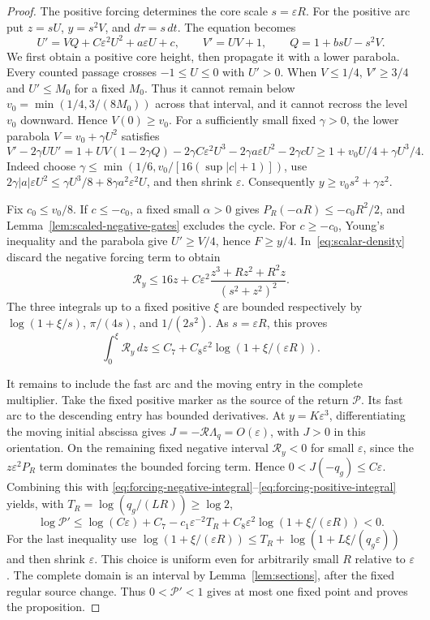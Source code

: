 \begin{proof}
The positive forcing determines the core scale $s=\varepsilon R$.
For the positive arc put $z=sU$, $y=s^2V$,
and $d\tau=s\,dt$. The equation becomes
\[
 U'=VQ+C\varepsilon^2U^2+a\varepsilon U+c,
 \qquad V'=UV+1,
 \qquad Q=1+bsU-s^2V.
\]
We first obtain a positive core height, then propagate it with a lower
parabola. Every counted passage crosses $-1\le U\le0$ with $U'>0$.
When $V\le1/4$, $V'\ge3/4$ and $U'\le M_0$ for a fixed
$M_0$. Thus it cannot remain below
$v_0=\min(1/4,3/(8M_0))$ across that interval, and it cannot
recross the level $v_0$ downward. Hence $V(0)\ge v_0$.
For a sufficiently small fixed $\gamma>0$, the lower parabola
$V=v_0+\gamma U^2$ satisfies
\[
 V'-2\gamma UU'
 =1+UV(1-2\gamma Q)-2\gamma C\varepsilon^2U^3
                         -2\gamma a\varepsilon U^2-2\gamma cU
 \ge1+v_0U/4+\gamma U^3/4.
\]
Indeed choose $\gamma\le\min(1/6,v_0/[16(\sup|c|+1)])$,
use $2\gamma|a|\varepsilon U^2\le\gamma U^3/8+
8\gamma a^2\varepsilon^2U$, and then shrink $\varepsilon$.
Consequently $y\ge v_0s^2+\gamma z^2$.

Fix $c_0\le v_0/8$. If $c\le-c_0$, a fixed small
$\alpha>0$ gives $P_R(-\alpha R)\le-c_0R^2/2$, and
Lemma~\ref{lem:scaled-negative-gates} excludes the cycle.
For $c\ge-c_0$, Young's inequality and the parabola give
$U'\ge V/4$, hence $F\ge y/4$. In~\eqref{eq:scalar-density}
discard the negative forcing term to obtain
\[
 \mathcal R_y\le16z+C\varepsilon^2
                  \frac{z^3+Rz^2+R^2z}{(s^2+z^2)^2}.
\]
The three integrals up to a fixed positive $\xi$ are bounded
respectively by $\log(1+\xi/s)$, $\pi/(4s)$, and $1/(2s^2)$.
As $s=\varepsilon R$, this proves
\begin{equation}\label{eq:forcing-positive-integral}
 \int_0^\xi\mathcal R_y\,dz
             \le C_7+C_8\varepsilon^2\log(1+\xi/(\varepsilon R)).
\end{equation}

It remains to include the fast arc and the moving entry in the complete
multiplier. Take the fixed positive marker as the source of the return
$\mathcal P$. Its fast arc to the descending entry has bounded
derivatives. At $y=K\varepsilon^3$, differentiating the moving
initial abscissa gives $J=-\mathcal R\Lambda_q=O(\varepsilon)$,
with $J>0$ in this orientation. On the remaining fixed negative
interval $\mathcal R_y<0$ for small $\varepsilon$, since the
$z\varepsilon^2P_R$ term dominates the bounded forcing term.
Hence $0<J(-q_g)\le C\varepsilon$. Combining this with
\eqref{eq:forcing-negative-integral}--\eqref{eq:forcing-positive-integral}
yields, with $T_R=\log(q_g/(LR))\ge\log2$,
\[
 \log\mathcal P'\le\log(C\varepsilon)+C_7
       -c_1\varepsilon^{-2}T_R
       +C_8\varepsilon^2\log(1+\xi/(\varepsilon R))<0.
\]
For the last inequality use
$\log(1+\xi/(\varepsilon R))\le T_R+
\log(1+L\xi/(q_g\varepsilon))$ and then shrink $\varepsilon$.
This choice is uniform even for arbitrarily small $R$ relative to $\varepsilon$.
The complete domain is an interval by Lemma~\ref{lem:sections},
after the fixed regular source change. Thus
$0<\mathcal P'<1$ gives at most one fixed point and proves the proposition.
\end{proof}
